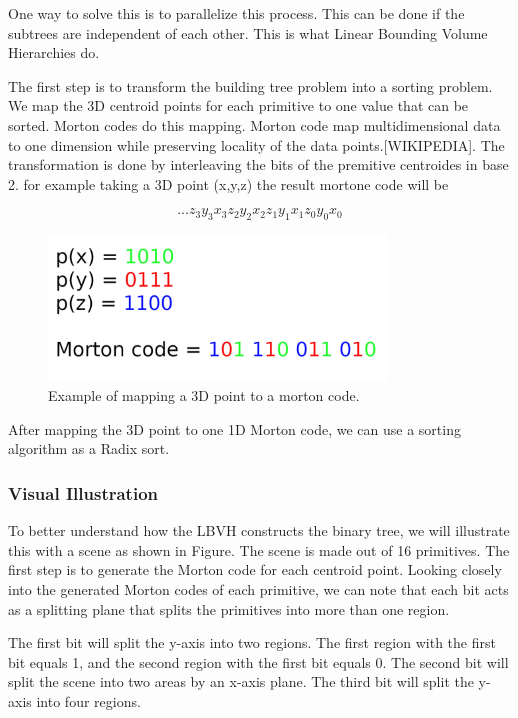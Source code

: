 \documentclass[11pt,a4paper]{article}
\begin{document}
One way to solve this is to parallelize this process. This can be done if the subtrees are independent of each other. This is what Linear Bounding Volume Hierarchies do.
\\
\noindent

The first step is to transform the building tree problem into a sorting problem. We map the 3D centroid points for each primitive to one value that can be sorted. Morton codes do this mapping. Morton code map multidimensional data to one dimension while preserving locality of the data points.[WIKIPEDIA]. The transformation is done by interleaving the bits of the premitive centroides in base 2. for example taking a 3D point (x,y,z) the result mortone code will be 

\begin{equation}
 ...z_3y_3x_3z_2y_2x_2z_1y_1x_1z_0y_0x_0
\end{equation}


\begin{figure}[h]	
     \centering
     \captionsetup{justification=centering,margin=2cm}
     \includegraphics[width=9cm]{images/z_curve.png}
     \caption{Example of mapping a 3D point to a morton code.}
     \label{fig:dice}
\end{figure}


After mapping the 3D point to one 1D Morton code, we can use a sorting algorithm as a Radix sort.

\subsubsection{Visual Illustration}
To better understand how the LBVH constructs the binary tree, we will illustrate this with a scene as shown in Figure. The scene is made out of 16 primitives. The first step is to generate the Morton code for each centroid point. Looking closely into the generated Morton codes of each primitive, we can note that each bit acts as a splitting plane that splits the primitives into more than one region. 
\\
\noindent

The first bit will split the y-axis into two regions. The first region with the first bit equals 1, and the second region with the first bit equals 0. The second bit will split the scene into two areas by an x-axis plane. The third bit will split the y-axis into four regions.
\end{document}
